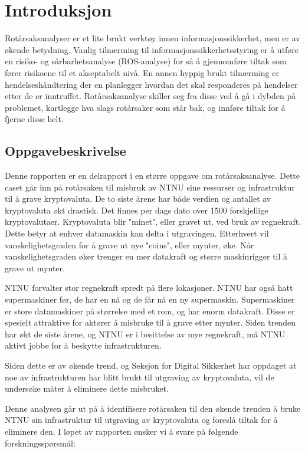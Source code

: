 \chapter{Introduksjon}
Rotårsaksanalyser er et lite brukt verktøy innen informasjonssikkerhet, men er av økende betydning. Vanlig tilnærming til informasjonssikkerhetsstyring er å utføre en risiko- og sårbarhetsanalyse (ROS-analyse) for så å gjennomføre tiltak som fører risikoene til et akseptabelt nivå. En annen hyppig brukt tilnærming er hendelseshåndtering der en planlegger hvordan det skal responderes på hendelser etter de er inntruffet. Rotårsaksanalyse skiller seg fra disse ved å gå i dybden på problemet, kartlegge hva slags rotårsaker som står bak, og innføre tiltak for å fjerne disse helt.

\section{Oppgavebeskrivelse}
Denne rapporten er en delrapport i en større oppgave om rotårsaksanalyse. Dette caset går inn på rotårsaken til misbruk av NTNU sine ressurser og infrastruktur til å grave kryptovaluta. De to siste årene har både verdien og antallet av kryptovaluta økt drastisk. Det finnes per dags dato over 1500 forskjellige kryptovalutaer. Kryptovaluta blir "minet", eller gravet ut, ved bruk av regnekraft. Dette betyr at enhver datamaskin kan delta i utgravingen. Etterhvert vil vanskelighetsgraden for å grave ut nye "coins", eller mynter, øke. Når vanskelighetsgraden øker trenger en mer datakraft og større maskinrigger til å grave ut mynter. 

NTNU forvalter stor regnekraft spredt på flere lokasjoner. NTNU har også hatt supermaskiner før, de har en nå og de får nå en ny supermaskin. Supermaskiner er store datamaskiner på størrelse med et rom, og har enorm datakraft. Disse er spesielt attraktive for aktører å misbruke til å grave etter mynter. Siden trenden har økt de siste årene, og NTNU er i besittelse av mye regnekraft, må NTNU aktivt jobbe for å beskytte infrastrukturen. 

Siden dette er av økende trend, og Seksjon for Digital Sikkerhet har oppdaget at noe av infrastrukturen har blitt brukt til utgraving av kryptovaluta, vil de undersøke måter å eliminere dette misbruket. 

Denne analysen går ut på å identifisere rotårsaken til den økende trenden å bruke NTNU sin infrastruktur til utgraving av kryptovaluta og foreslå tiltak for å eliminere den. I løpet av rapporten ønsker vi å svare på følgende forskningsspørsmål:


